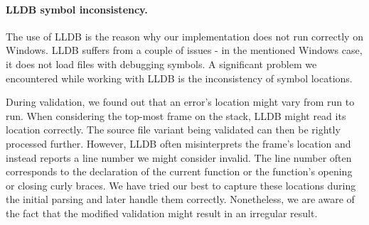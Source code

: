 \paragraph{LLDB symbol inconsistency.}
The use of LLDB is the reason why our implementation does not run correctly 
on Windows. 
LLDB suffers from a couple of issues - in the mentioned Windows case, it does 
not load files with debugging symbols.
A significant problem we encountered while working with LLDB is 
the inconsistency of symbol locations. 

During validation, we found out that an error's location might vary from run 
to run. 
When considering the top-most frame on the stack, LLDB might read its 
location correctly. 
The source file variant being validated can then be rightly processed further. 
However, LLDB often misinterprets the frame's location and instead reports 
a line number we might consider invalid. 
The line number often corresponds to the declaration of the current function 
or the function's opening or closing curly braces. 
We have tried our best to capture these locations during the initial parsing 
and later handle them correctly. 
Nonetheless, we are aware of the fact that the modified validation might 
result in an irregular result.